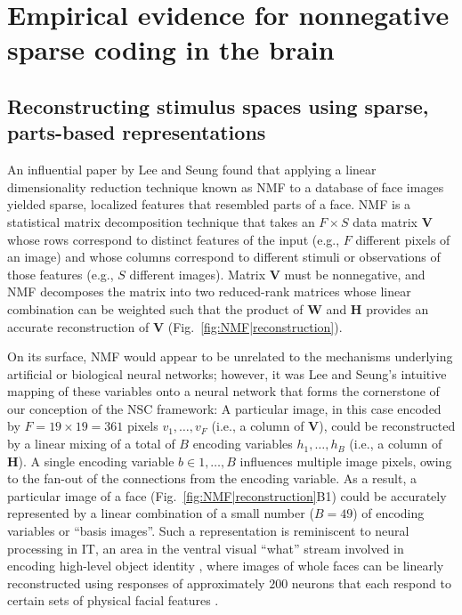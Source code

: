 \section{Empirical evidence for nonnegative sparse coding in the brain}

\subsection{Reconstructing stimulus spaces using sparse, parts-based representations}

An influential paper by Lee and Seung \citep{LeeSeung1999}
found that applying a linear dimensionality reduction technique
known as \ac{NMF} to a database of face images
yielded sparse, localized features that resembled parts of a face.
\ac{NMF} is a statistical matrix decomposition technique 
that takes an $F \times S$ data matrix \textbf{V} 
whose rows correspond to distinct features of the input 
(e.g., $F$ different pixels of an image)
and whose columns correspond to different stimuli or 
observations of those features
(e.g., $S$ different images). 
Matrix \textbf{V} must be nonnegative, and \ac{NMF} decomposes the matrix into two reduced-rank matrices whose linear combination can be weighted such that the product of \textbf{W} and \textbf{H} provides an accurate reconstruction of \textbf{V} (Fig.~\ref{fig:NMF|reconstruction}).

On its surface, \ac{NMF} would appear to be unrelated to 
the mechanisms underlying 
artificial or biological neural networks;
however, it was Lee and Seung's intuitive mapping of these variables onto
a neural network that forms the cornerstone 
of our conception of the \ac{NSC} framework:
A particular image, in this case encoded by $F = 19 \times 19 = 361$ 
pixels $v_1, \ldots, v_F$
(i.e., a column of \textbf{V}),
could be reconstructed by a linear mixing of a total of $B$ encoding variables
$h_1, \ldots, h_B$ (i.e., a column of \textbf{H}).
A single encoding variable $b \in 1, \ldots, B$ 
influences multiple image pixels,
owing to the fan-out of the connections from the encoding variable.
As a result, a particular image of a face (Fig.~\ref{fig:NMF|reconstruction}B1)
could be accurately represented by a linear combination of 
a small number ($B = 49$) of encoding variables or ``basis images''.
Such a representation is reminiscent to neural processing in \ac{IT},
an area in the ventral visual ``what'' stream
involved in encoding high-level object identity
\citep{BrincatConnor2004,Majaj2015},
where images of whole faces can be linearly reconstructed
using responses of approximately $200$ neurons
that each respond to certain sets of physical facial features
\citep{ChangTsao2017}.

